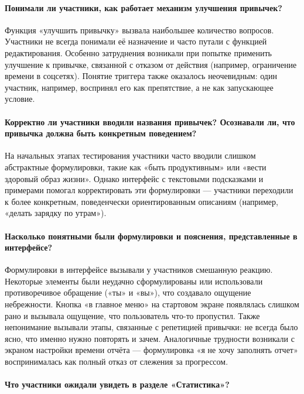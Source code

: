 \documentclass[pdflatex,sn-mathphys-num]{sn-jnl}%
\theoremstyle{thmstyleone}%
\theoremstyle{thmstyletwo}%
\theoremstyle{thmstylethree}%
\begin{document}
\paragraph{Понимали ли участники, как работает механизм улучшения привычек?}

Функция «улучшить привычку» вызвала наибольшее количество вопросов. Участники не всегда понимали её назначение и часто путали с функцией редактирования. Особенно затруднения возникали при попытке применить улучшение к привычке, связанной с отказом от действия (например, ограничение времени в соцсетях). Понятие триггера также оказалось неочевидным: один участник, например, воспринял его как препятствие, а не как запускающее условие.

\paragraph{Корректно ли участники вводили названия привычек? Осознавали ли, что привычка должна быть конкретным поведением?}

На начальных этапах тестирования участники часто вводили слишком абстрактные формулировки, такие как «быть продуктивным» или «вести здоровый образ жизни». Однако интерфейс с текстовыми подсказками и примерами помогал корректировать эти формулировки — участники переходили к более конкретным, поведенчески ориентированным описаниям (например, «делать зарядку по утрам»).

\paragraph{Насколько понятными были формулировки и пояснения, представленные в интерфейсе?}

Формулировки в интерфейсе вызывали у участников смешанную реакцию. Некоторые элементы были неудачно сформулированы или использовали противоречивое обращение («ты» и «вы»), что создавало ощущение небрежности. Кнопка «в главное меню» на стартовом экране появлялась слишком рано и вызывала ощущение, что пользователь что-то пропустил. Также непонимание вызывали этапы, связанные с репетицией привычки: не всегда было ясно, что именно нужно повторять и зачем. Аналогичные трудности возникали с экраном настройки времени отчёта — формулировка «я не хочу заполнять отчет» воспринималась как полный отказ от слежения за прогрессом.

\paragraph{Что участники ожидали увидеть в разделе «Статистика»?}
\end{document}
